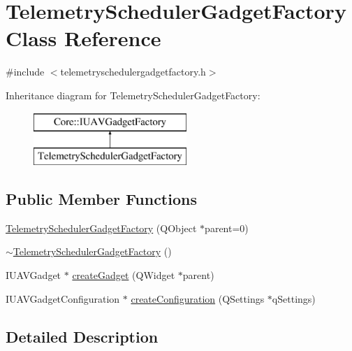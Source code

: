 \hypertarget{class_telemetry_scheduler_gadget_factory}{\section{\-Telemetry\-Scheduler\-Gadget\-Factory \-Class \-Reference}
\label{class_telemetry_scheduler_gadget_factory}
}


{\ttfamily \#include $<$telemetryschedulergadgetfactory.\-h$>$}

\-Inheritance diagram for \-Telemetry\-Scheduler\-Gadget\-Factory\-:\begin{figure}[H]
\begin{center}
\leavevmode
\includegraphics[height=2.000000cm]{class_telemetry_scheduler_gadget_factory}
\end{center}
\end{figure}
\subsection*{\-Public \-Member \-Functions}
\begin{DoxyCompactItemize}
\item 
\hyperlink{group___telemetry_scheduler_gadget_plugin_gaedbbe99f590cc8a0e230cf23937f7316}{\-Telemetry\-Scheduler\-Gadget\-Factory} (\-Q\-Object $\ast$parent=0)
\item 
\hyperlink{group___telemetry_scheduler_gadget_plugin_ga47b5dde062b0523950233697f47b9420}{$\sim$\-Telemetry\-Scheduler\-Gadget\-Factory} ()
\item 
\-I\-U\-A\-V\-Gadget $\ast$ \hyperlink{group___telemetry_scheduler_gadget_plugin_ga629a61572510189951830b25d358fcef}{create\-Gadget} (\-Q\-Widget $\ast$parent)
\item 
\-I\-U\-A\-V\-Gadget\-Configuration $\ast$ \hyperlink{group___telemetry_scheduler_gadget_plugin_ga63743e652574ec8f92d48017d86250a3}{create\-Configuration} (\-Q\-Settings $\ast$q\-Settings)
\end{DoxyCompactItemize}


\subsection{\-Detailed \-Description}


